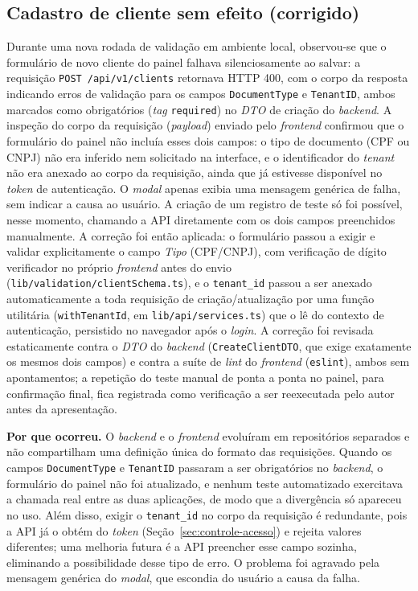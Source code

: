 \subsection{Cadastro de cliente sem efeito (corrigido)}
\label{sec:falha-cadastro-cliente}

Durante uma nova rodada de validação em ambiente local, observou-se que o formulário de novo cliente do painel falhava silenciosamente ao salvar: a requisição \texttt{POST /\allowbreak{}api/\allowbreak{}v1/\allowbreak{}clients} retornava HTTP 400, com o corpo da resposta indicando erros de validação para os campos \texttt{DocumentType} e \texttt{TenantID}, ambos marcados como obrigatórios (\textit{tag} \texttt{required}) no \textit{DTO} de criação do \textit{backend}. A inspeção do corpo da requisição (\textit{payload}) enviado pelo \textit{frontend} confirmou que o formulário do painel não incluía esses dois campos: o tipo de documento (CPF ou CNPJ) não era inferido nem solicitado na interface, e o identificador do \textit{tenant} não era anexado ao corpo da requisição, ainda que já estivesse disponível no \textit{token} de autenticação. O \textit{modal} apenas exibia uma mensagem genérica de falha, sem indicar a causa ao usuário. A criação de um registro de teste só foi possível, nesse momento, chamando a API diretamente com os dois campos preenchidos manualmente. A correção foi então aplicada: o formulário passou a exigir e validar explicitamente o campo \textit{Tipo} (CPF/CNPJ), com verificação de dígito verificador no próprio \textit{frontend} antes do envio (\texttt{lib/\allowbreak{}validation/\allowbreak{}clientSchema.ts}), e o \texttt{tenant\_id} passou a ser anexado automaticamente a toda requisição de criação/atualização por uma função utilitária (\texttt{withTenantId}, em \texttt{lib/\allowbreak{}api/\allowbreak{}services.ts}) que o lê do contexto de autenticação, persistido no navegador após o \textit{login}. A correção foi revisada estaticamente contra o \textit{DTO} do \textit{backend} (\texttt{CreateClientDTO}, que exige exatamente os mesmos dois campos) e contra a suíte de \textit{lint} do \textit{frontend} (\texttt{eslint}), ambos sem apontamentos; a repetição do teste manual de ponta a ponta no painel, para confirmação final, fica registrada como verificação a ser reexecutada pelo autor antes da apresentação.

\textbf{Por que ocorreu.} O \textit{backend} e o \textit{frontend} evoluíram em repositórios separados e não compartilham uma definição única do formato das requisições. Quando os campos \texttt{DocumentType} e \texttt{TenantID} passaram a ser obrigatórios no \textit{backend}, o formulário do painel não foi atualizado, e nenhum teste automatizado exercitava a chamada real entre as duas aplicações, de modo que a divergência só apareceu no uso. Além disso, exigir o \texttt{tenant\_id} no corpo da requisição é redundante, pois a API já o obtém do \textit{token} (Seção~\ref{sec:controle-acesso}) e rejeita valores diferentes; uma melhoria futura é a API preencher esse campo sozinha, eliminando a possibilidade desse tipo de erro. O problema foi agravado pela mensagem genérica do \textit{modal}, que escondia do usuário a causa da falha.

